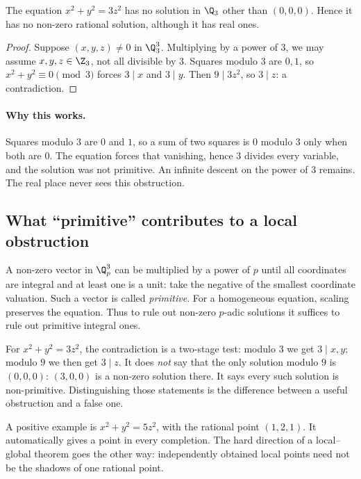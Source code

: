 \begin{proposition}\label{prop:noconic}
The equation $x^2+y^2=3z^2$ has no solution in $\Q_3$ other than $(0,0,0)$. Hence it has no non-zero rational solution, although it has real ones.
\end{proposition}
\begin{proof}
Suppose $(x,y,z)\ne0$ in $\Q_3^3$. Multiplying by a power of $3$, we may assume $x,y,z\in\Z_3$, not all divisible by $3$. Squares modulo $3$ are $0,1$, so $x^2+y^2\equiv0\pmod 3$ forces $3\mid x$ and $3\mid y$. Then $9\mid3z^2$, so $3\mid z$: a contradiction.
\end{proof}

\paragraph{Why this works.}
Squares modulo $3$ are $0$ and $1$, so a sum of two squares is $0$ modulo $3$ only when both are $0$. The equation forces that vanishing, hence $3$ divides every variable, and the solution was not primitive. An infinite descent on the power of $3$ remains. The real place never sees this obstruction.

\subsection*{What ``primitive'' contributes to a local obstruction}
A non-zero vector in $\Q_p^3$ can be multiplied by a power of $p$ until all
coordinates are integral and at least one is a unit: take the negative of the
smallest coordinate valuation. Such a vector is called \emph{primitive}.
For a homogeneous equation, scaling preserves the equation. Thus to rule out
non-zero $p$-adic solutions it suffices to rule out primitive integral ones.

For $x^2+y^2=3z^2$, the contradiction is a two-stage test: modulo $3$ we get
$3\mid x,y$; modulo $9$ we then get $3\mid z$. It does \emph{not} say that the
only solution modulo $9$ is $(0,0,0)$: $(3,0,0)$ is a non-zero solution there.
It says every such solution is non-primitive. Distinguishing those statements
is the difference between a useful obstruction and a false one.

A positive example is $x^2+y^2=5z^2$, with the rational point $(1,2,1)$.
It automatically gives a point in every completion. The hard direction of a
local--global theorem goes the other way: independently obtained local points
need not be the shadows of one rational point.

